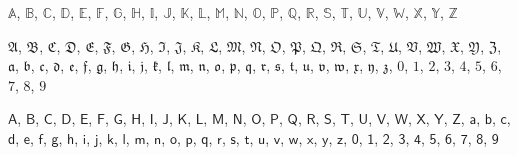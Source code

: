 \documentclass[a4paper,11pt]{article}
\begin{document}
\vspace{1em}





\noindent
$\mathbb{A}$, $\mathbb{B}$, $\mathbb{C}$, $\mathbb{D}$, $\mathbb{E}$,
$\mathbb{F}$, $\mathbb{G}$, $\mathbb{H}$, $\mathbb{I}$, $\mathbb{J}$,
$\mathbb{K}$, $\mathbb{L}$, $\mathbb{M}$, $\mathbb{N}$, $\mathbb{O}$,
$\mathbb{P}$, $\mathbb{Q}$, $\mathbb{R}$, $\mathbb{S}$, $\mathbb{T}$,
$\mathbb{U}$, $\mathbb{V}$, $\mathbb{W}$, $\mathbb{X}$, $\mathbb{Y}$,
$\mathbb{Z}$

\vspace{1em}





\noindent
$\mathfrak{A}$, $\mathfrak{B}$, $\mathfrak{C}$, $\mathfrak{D}$,
$\mathfrak{E}$, $\mathfrak{F}$, $\mathfrak{G}$, $\mathfrak{H}$,
$\mathfrak{I}$, $\mathfrak{J}$, $\mathfrak{K}$, $\mathfrak{L}$,
$\mathfrak{M}$, $\mathfrak{N}$, $\mathfrak{O}$, $\mathfrak{P}$,
$\mathfrak{Q}$, $\mathfrak{R}$, $\mathfrak{S}$, $\mathfrak{T}$,
$\mathfrak{U}$, $\mathfrak{V}$, $\mathfrak{W}$, $\mathfrak{X}$,
$\mathfrak{Y}$, $\mathfrak{Z}$, \quad
$\mathfrak{a}$, $\mathfrak{b}$, $\mathfrak{c}$, $\mathfrak{d}$,
$\mathfrak{e}$, $\mathfrak{f}$, $\mathfrak{g}$, $\mathfrak{h}$,
$\mathfrak{i}$, $\mathfrak{j}$, $\mathfrak{k}$, $\mathfrak{l}$,
$\mathfrak{m}$, $\mathfrak{n}$, $\mathfrak{o}$, $\mathfrak{p}$,
$\mathfrak{q}$, $\mathfrak{r}$, $\mathfrak{s}$, $\mathfrak{t}$,
$\mathfrak{u}$, $\mathfrak{v}$, $\mathfrak{w}$, $\mathfrak{x}$,
$\mathfrak{y}$, $\mathfrak{z}$, \quad
$\mathfrak{0}$, $\mathfrak{1}$, $\mathfrak{2}$, $\mathfrak{3}$,
$\mathfrak{4}$, $\mathfrak{5}$, $\mathfrak{6}$, $\mathfrak{7}$,
$\mathfrak{8}$, $\mathfrak{9}$

\vspace{1em}





\noindent
$\mathsf{A}$, $\mathsf{B}$, $\mathsf{C}$, $\mathsf{D}$, $\mathsf{E}$,
$\mathsf{F}$, $\mathsf{G}$, $\mathsf{H}$, $\mathsf{I}$, $\mathsf{J}$,
$\mathsf{K}$, $\mathsf{L}$, $\mathsf{M}$, $\mathsf{N}$, $\mathsf{O}$,
$\mathsf{P}$, $\mathsf{Q}$, $\mathsf{R}$, $\mathsf{S}$, $\mathsf{T}$,
$\mathsf{U}$, $\mathsf{V}$, $\mathsf{W}$, $\mathsf{X}$, $\mathsf{Y}$,
$\mathsf{Z}$, \quad
$\mathsf{a}$, $\mathsf{b}$, $\mathsf{c}$, $\mathsf{d}$, $\mathsf{e}$,
$\mathsf{f}$, $\mathsf{g}$, $\mathsf{h}$, $\mathsf{i}$, $\mathsf{j}$,
$\mathsf{k}$, $\mathsf{l}$, $\mathsf{m}$, $\mathsf{n}$, $\mathsf{o}$,
$\mathsf{p}$, $\mathsf{q}$, $\mathsf{r}$, $\mathsf{s}$, $\mathsf{t}$,
$\mathsf{u}$, $\mathsf{v}$, $\mathsf{w}$, $\mathsf{x}$, $\mathsf{y}$,
$\mathsf{z}$, \quad
$\mathsf{0}$, $\mathsf{1}$, $\mathsf{2}$, $\mathsf{3}$, $\mathsf{4}$,
$\mathsf{5}$, $\mathsf{6}$, $\mathsf{7}$, $\mathsf{8}$, $\mathsf{9}$
\end{document}
